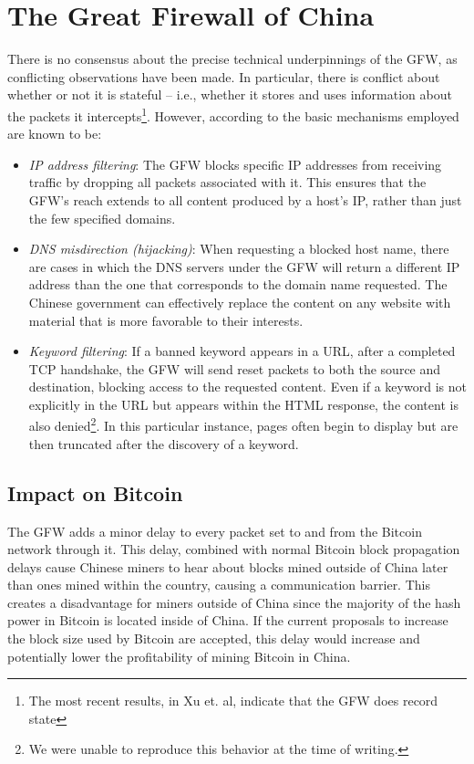 \section{The Great Firewall of China}
There is no consensus about the precise technical underpinnings of the GFW, as conflicting observations have been made. In particular, there is conflict about whether or not it is stateful -- i.e., whether it stores and uses information about the packets it intercepts\footnote{The most recent results, in Xu et. al\cite{Xu2011}, indicate that the GFW does record state}. However, according to \cite{GFWStanord} the basic mechanisms employed are known to be:

\begin{itemize}
\item \textit{IP address filtering}:
The GFW blocks specific IP addresses from receiving traffic by dropping all packets associated with it. This ensures that the GFW's reach extends to all content produced by a host's IP, rather than just the few specified domains.

\item \textit{DNS misdirection (hijacking)}:
When requesting a blocked host name, there are cases in which the DNS servers under the GFW will return a different IP address than the one that corresponds to the domain name requested. The Chinese government can effectively replace the content on any website with material that is more favorable to their interests.

\item \textit{Keyword filtering}:
If a banned keyword appears in a URL, after a completed TCP handshake, the GFW will send reset packets to both the source and destination, blocking access to the requested content. Even if a keyword is not explicitly in the URL but appears within the HTML response, the content is also denied\footnote{We were unable to reproduce this behavior at the time of writing.}. In this particular instance, pages often begin to display but are then truncated after the discovery of a keyword.
\end{itemize}

\subsection{Impact on Bitcoin}
The GFW adds a minor delay to every packet set to and from the Bitcoin network through it. This delay, combined with normal Bitcoin block propagation delays cause Chinese miners to hear about blocks mined outside of China later than ones mined within the country, causing a communication barrier. This creates a disadvantage for miners outside of China since the majority of the hash power in Bitcoin is located inside of China. If the current proposals to increase the block size used by Bitcoin are accepted, this delay would increase and potentially lower the profitability of mining Bitcoin in China.  \cite{nasdaq}
